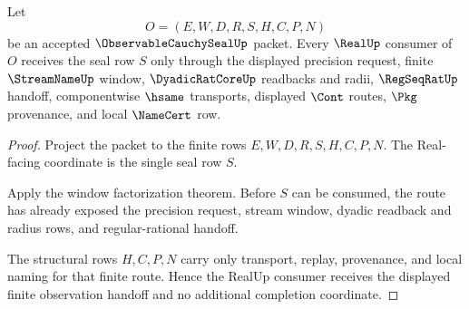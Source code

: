 \begin{theorem}
\label{thm:observable-cauchy-seal-real-handoff}
Let
$$
O=(E,W,D,R,S,H,C,P,N)
$$
be an accepted $\ObservableCauchySealUp$ packet. Every $\RealUp$ consumer of $O$ receives the seal row $S$ only through the displayed precision request, finite $\StreamNameUp$ window, $\DyadicRatCoreUp$ readbacks and radii, $\RegSeqRatUp$ handoff, componentwise $\hsame$ transports, displayed $\Cont$ routes, $\Pkg$ provenance, and local $\NameCert$ row.
\end{theorem}
\begin{proof}
Project the packet to the finite rows $E,W,D,R,S,H,C,P,N$. The Real-facing coordinate is the single seal row $S$.

Apply the window factorization theorem. Before $S$ can be consumed, the route has already exposed the precision request, stream window, dyadic readback and radius rows, and regular-rational handoff.

The structural rows $H,C,P,N$ carry only transport, replay, provenance, and local naming for that finite route. Hence the RealUp consumer receives the displayed finite observation handoff and no additional completion coordinate.
\end{proof}

